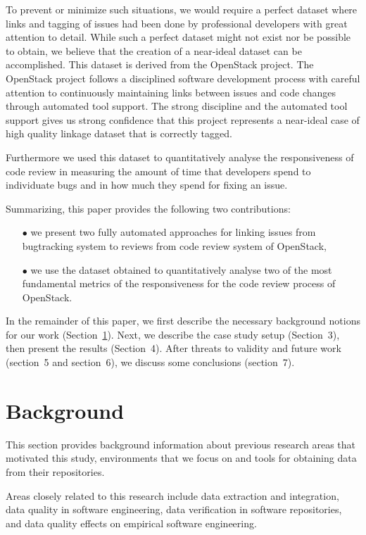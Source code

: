 \documentclass{llncs}
\begin{document}
To prevent or minimize such situations, we would require a perfect dataset where links 
and tagging of issues had been done by professional developers with great attention to detail. 
While such a perfect dataset might not exist nor be possible to obtain, we believe that the creation of a near-ideal dataset can be accomplished. 
This dataset is derived from the OpenStack project. The OpenStack project follows a disciplined 
software development process with careful attention to continuously maintaining links 
between issues and code changes through automated tool support. The strong discipline and the 
automated tool support gives us strong confidence that this project represents a near-ideal 
case of high quality linkage dataset that is correctly tagged.

Furthermore we used this dataset to quantitatively analyse the responsiveness of code review in 
measuring the amount of time that developers spend to individuate bugs and in how much they spend 
for fixing an issue.


Summarizing, this paper provides the following two contributions:

\begin{itemize}
 \item[$\bullet$] we present two fully automated approaches for linking issues from 
 bugtracking system to reviews from code review system of OpenStack,
 \item[$\bullet$] we use the dataset obtained to quantitatively analyse two of the 
 most fundamental metrics of the responsiveness for the code review process of OpenStack. 
\end{itemize}

In the remainder of this paper, we first describe the necessary background notions for our work (Section~\ref{sec:background}). Next, we describe the 
case study setup (Section~3), then present the results (Section~4). After threats to 
validity and future work (section~5 and section~6), we discuss some conclusions (section~7).

\section{Background}
\label{sec:background}

This section provides background information about previous research areas that motivated this study, 
environments that we focus on and tools for obtaining data from their repositories. 

Areas closely related to this research include data extraction and integration, data quality 
in software engineering, 
data verification in software repositories, and data quality effects on empirical software 
engineering.
\end{document}
